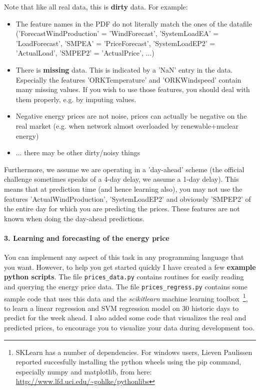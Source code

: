 \documentclass[a4,10pt]{article}
\begin{document}
Note that like all real data, this is \textbf{dirty} data. For example:
\begin{itemize}
\item The feature names in the PDF do not literally match the ones of the datafile ('ForecastWindProduction' = 'WindForecast', 'SystemLoadEA' = 'LoadForecast', 'SMPEA' = 'PriceForecast', 'SystemLoadEP2' = 'ActualLoad', 'SMPEP2' = 'ActualPrice', ...)
\item There is \textbf{missing} data. This is indicated by a 'NaN' entry in the data. Especially the features 'ORKTemperature' and 'ORKWindspeed' contain many missing values. If you wish to use those features, you should deal with them properly, e.g. by imputing values.
\item Negative energy prices are not noise, prices can actually be negative on the real market (e.g. when network almost overloaded by renewable+nuclear energy)
\item ... there may be other dirty/noisy things
\end{itemize}

Furthermore, we assume we are operating in a 'day-ahead' scheme (the official challenge sometimes speaks of a 4-day delay, we assume a 1-day delay). This means that at prediction time (and hence learning also), you may not use the features 'ActualWindProduction', 'SystemLoadEP2' and obviously 'SMPEP2' of the entire day for which you are predicting the prices. These features are not known when doing the day-ahead predictions.


\paragraph{3. Learning and forecasting of the energy price}
You can implement any aspect of this task in any programming language that you want. However, to help you get started quickly I have created a few \textbf{example python scripts}. The file \texttt{prices\_data.py} contains routines for easily reading and querying the energy price data. The file \texttt{prices\_regress.py} contains some sample code that uses this data and the \textit{scikitlearn} machine learning toolbox~\footnote{SKLearn has a number of dependencies. For windows users, Lieven Paulissen reported succesfully installing the python wheels using the pip command, especially numpy and matplotlib, from here: \url{http://www.lfd.uci.edu/~gohlke/pythonlibs}}, to learn a linear regression and SVM regression model on 30 historic days to predict for the week ahead. I also added some code that visualizes the real and predicted prices, to encourage you to visualize your data during development too.
\end{document}
